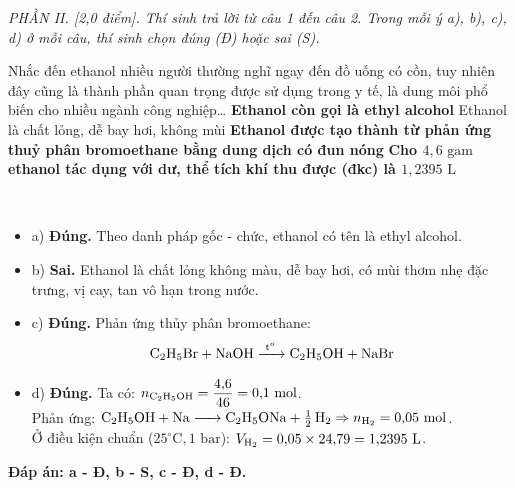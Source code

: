 \documentclass[12pt,a4paper]{article}
\renewcommand{\loigiai}[1]{%
  \par\smallskip\noindent{\color{blue!80!black}\textbf{Lời giải:}}\ #1\par\smallskip
}
\renewcommand{\True}{\bfseries\color{red!80!black}}
\begin{document}
\bigskip
\begin{flushleft}
	{\color{blue!50!green}}
\end{flushleft}
\setcounter{ex}{0}
\setcounter{bt}{0}

\textit{PHẦN II. [2,0 điểm]. Thí sinh trả lời từ câu 1 đến câu 2. Trong mỗi ý a), b), c), d) ở mỗi câu, thí sinh chọn đúng (Đ) hoặc sai (S).}

\begin{ex}
Nhắc đến ethanol nhiều người thường nghĩ ngay đến đồ uống có cồn, tuy nhiên đây cũng là thành phần quan trọng được sử dụng trong y tế, là dung môi phổ biến cho nhiều ngành công nghiệp\dots
\choiceTF
{\True Ethanol còn gọi là ethyl alcohol}
{Ethanol là chất lỏng, dễ bay hơi, không mùi}
{\True Ethanol được tạo thành từ phản ứng thuỷ phân bromoethane bằng dung dịch  có đun nóng}
{\True Cho $4{,}6\text{ gam}$ ethanol tác dụng với  dư, thể tích khí  thu được (đkc) là $1{,}2395\text{ L}$}
\loigiai{
\begin{itemize}
  \item a) \textbf{Đúng.} Theo danh pháp gốc - chức, ethanol có tên là ethyl alcohol.
  \item b) \textbf{Sai.} Ethanol là chất lỏng không màu, dễ bay hơi, có mùi thơm nhẹ đặc trưng, vị cay, tan vô hạn trong nước.
  \item c) \textbf{Đúng.} Phản ứng thủy phân bromoethane:
  $$\ce{C2H5Br + NaOH ->[t^o] C2H5OH + NaBr}$$
  \item d) \textbf{Đúng.} Ta có: $n_{\ce{C2H5OH}} = \dfrac{4{,}6}{46} = 0{,}1\text{ mol}$.\\
  Phản ứng: $\ce{C2H5OH + Na -> C2H5ONa + 1/2 H2} \Rightarrow n_{\ce{H2}} = 0{,}05\text{ mol}$.\\
  Ở điều kiện chuẩn ($25^\circ\text{C}, 1\text{ bar}$): $V_{\ce{H2}} = 0{,}05 \times 24{,}79 = 1{,}2395\text{ L}$.
\end{itemize}
\textbf{Đáp án: a - Đ, b - S, c - Đ, d - Đ.}
}
\end{ex}
\end{document}
